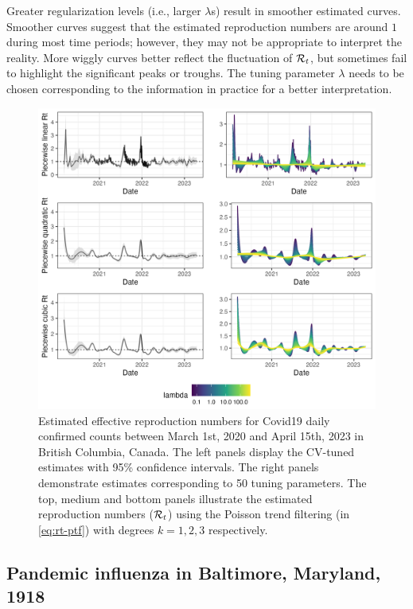 Greater regularization levels (i.e., larger $\lambda$s) result in smoother estimated curves. Smoother curves suggest that the estimated reproduction numbers are around $1$ during most time periods; however, they may not be appropriate to interpret the reality. More wiggly curves better reflect the fluctuation of $\mathcal{R}_t$, but sometimes fail to highlight the significant peaks or troughs. The tuning parameter $\lambda$ needs to be chosen corresponding to the information in practice for a better interpretation. 
\begin{figure}[tb]
    \centering
    \includegraphics[width=0.99\linewidth]{fig/covid_full_res.png}
    \caption{Estimated effective reproduction numbers for Covid19 daily confirmed counts between March 1st, 2020 and April 15th, 2023 in British Columbia, Canada. The left panels display the CV-tuned estimates with 95\% confidence intervals. The right panels demonstrate estimates corresponding to 50 tuning parameters. The top, medium and bottom panels illustrate the estimated reproduction numbers ($\mathcal{R}_t$) using the Poisson trend filtering (in \eqref{eq:rt-ptf}) with degrees $k=1,2,3$ respectively.} 
    \label{fig:covid-res}
\end{figure} 


\subsection{Pandemic influenza in Baltimore, Maryland, 1918}

